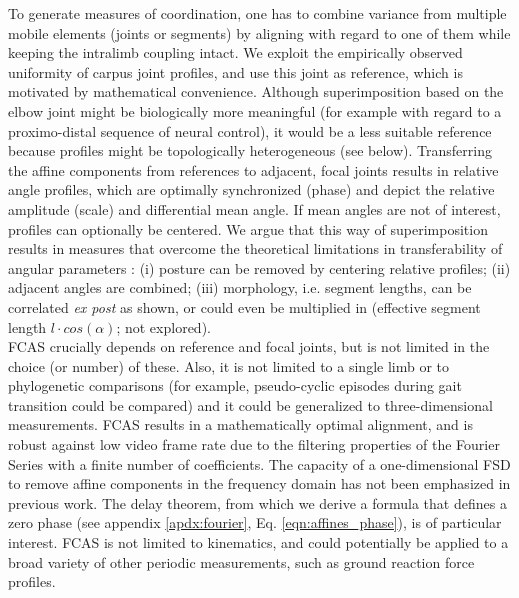 To generate measures of coordination, one has to combine variance from multiple mobile elements (joints or segments) by aligning with regard to one of them while keeping the intralimb coupling intact.
We exploit the empirically observed uniformity of carpus joint profiles, and use this joint as reference, which is motivated by mathematical convenience.
Although superimposition based on the elbow joint might be biologically more meaningful (for example with regard to a proximo-distal sequence of neural control), it would be a less suitable reference because profiles might be topologically heterogeneous (see below).
Transferring the affine components from references to adjacent, focal joints results in relative angle profiles, which are optimally synchronized (phase) and depict the relative amplitude (scale) and differential mean angle.
If mean angles are not of interest, profiles can optionally be centered.
We argue that this way of superimposition results in measures that overcome the theoretical limitations in transferability of angular parameters \citep{Gatesy2011}: (i) posture can be removed by centering relative profiles; (ii) adjacent angles are combined; (iii) morphology, i.e. segment lengths, can be correlated \textit{ex post} as shown, or could even be multiplied in (effective segment length $l\cdot cos\left(\alpha\right)$; not explored).
\\FCAS crucially depends on reference and focal joints, but is not limited in the choice (or number) of these.
Also, it is not limited to a single limb or to phylogenetic comparisons (for example, pseudo-cyclic episodes during gait transition could be compared) and it could be generalized to three-dimensional measurements.
FCAS results in a mathematically optimal alignment, and is robust against low video frame rate due to the filtering properties of the Fourier Series with a finite number of coefficients.
The capacity of a one-dimensional FSD to remove affine components in the frequency domain has not been emphasized in previous work.
The delay theorem, from which we derive a formula that defines a zero phase (see appendix \ref*{apdx:fourier}, Eq. \ref*{eqn:affines_phase}), is of particular interest.
FCAS is not limited to kinematics, and could potentially be applied to a broad variety of other periodic measurements, such as ground reaction force profiles.


